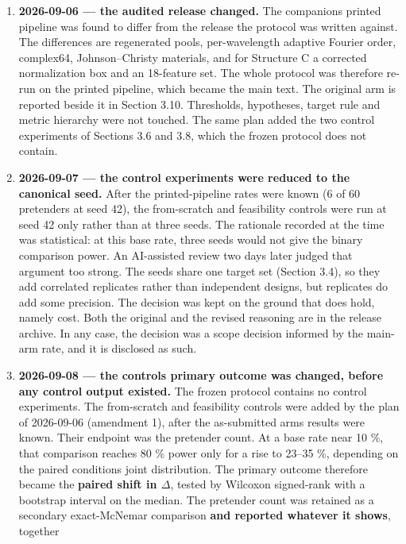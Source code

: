 \documentclass[11pt,a4paper]{article}
\providecommand{\tightlist}{\setlength{\itemsep}{0pt}\setlength{\parskip}{0pt}}
\begin{document}
\begin{enumerate}
\def\labelenumi{\arabic{enumi}.}
\tightlist
\item
  \textbf{2026-09-06 --- the audited release changed.} The companion\textquotesingle s printed pipeline was
  found to differ from the release the protocol was written against. The differences are
  regenerated pools, per-wavelength adaptive Fourier order, complex64, Johnson--Christy
  materials, and for Structure C a corrected normalization box and an 18-feature set. The
  whole protocol was therefore re-run on the printed pipeline, which became the main
  text. The original arm is reported beside it in Section 3.10. Thresholds, hypotheses,
  target rule and metric hierarchy were not touched. The same plan added the two control
  experiments of Sections 3.6 and 3.8, which the frozen protocol does not contain.
\item
  \textbf{2026-09-07 --- the control experiments were reduced to the canonical seed.} After the
  printed-pipeline rates were known (6 of 60 pretenders at seed 42), the from-scratch and
  feasibility controls were run at seed 42 only rather than at three seeds. The rationale
  recorded at the time was statistical: at this base rate, three seeds would not give the
  binary comparison power. An AI-assisted review two days later judged that argument too
  strong. The seeds share one target set (Section 3.4), so they add correlated replicates
  rather than independent designs, but replicates do add some precision. The decision was
  kept on the ground that does hold, namely cost. Both the original and the revised
  reasoning are in the release archive. In any case, the decision was a scope decision
  informed by the main-arm rate, and it is disclosed as such.
\item
  \textbf{2026-09-08 --- the controls\textquotesingle{} primary outcome was changed, before any control output
  existed.} The frozen protocol contains no control experiments. The from-scratch and
  feasibility controls were added by the plan of 2026-09-06 (amendment 1), after the
  as-submitted arm\textquotesingle s results were known. Their endpoint was the pretender count. At a base rate near 10 \%, that comparison reaches 80 \% power only for a rise to 23--35 \%, depending on the paired conditions\textquotesingle{} joint distribution.
  The primary outcome therefore became the \textbf{paired shift in \ensuremath{\Delta}}, tested by Wilcoxon
  signed-rank with a bootstrap interval on the median. The pretender count was retained
  as a secondary exact-McNemar comparison \textbf{and reported whatever it shows}, together

\end{enumerate}
\end{document}
